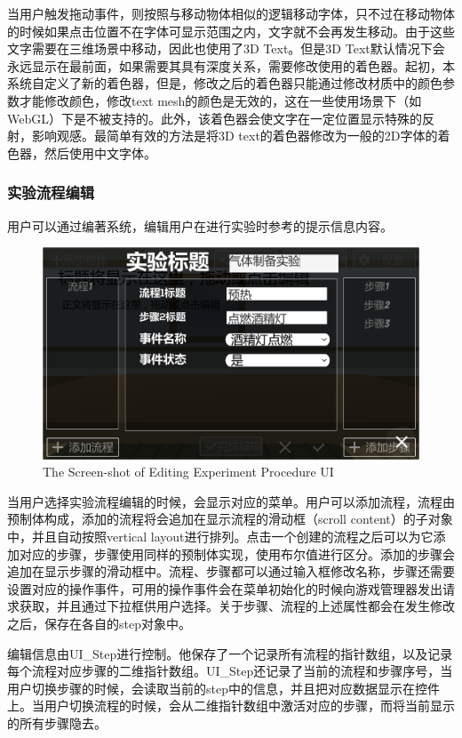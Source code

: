 当用户触发拖动事件，则按照与移动物体相似的逻辑移动字体，只不过在移动物体的时候如果点击位置不在字体可显示范围之内，文字就不会再发生移动。由于这些文字需要在三维场景中移动，因此也使用了3D Text。但是3D Text默认情况下会永远显示在最前面，如果需要其具有深度关系，需要修改使用的着色器。起初，本系统自定义了新的着色器，但是，修改之后的着色器只能通过修改材质中的颜色参数才能修改颜色，修改text mesh的颜色是无效的，这在一些使用场景下（如WebGL）下是不被支持的。此外，该着色器会使文字在一定位置显示特殊的反射，影响观感。最简单有效的方法是将3D text的着色器修改为一般的2D字体的着色器，然后使用中文字体。

\subsubsection{实验流程编辑}
用户可以通过编著系统，编辑用户在进行实验时参考的提示信息内容。

\begin{figure}[!htp]
  \centering
  \includegraphics[width=12cm]{figure/step.png}
    {The Screen-shot of Editing Experiment Procedure UI}
 \label{fig:gm}
\end{figure}

当用户选择实验流程编辑的时候，会显示对应的菜单。用户可以添加流程，流程由预制体构成，添加的流程将会追加在显示流程的滑动框（scroll content）的子对象中，并且自动按照vertical layout进行排列。点击一个创建的流程之后可以为它添加对应的步骤，步骤使用同样的预制体实现，使用布尔值进行区分。添加的步骤会追加在显示步骤的滑动框中。流程、步骤都可以通过输入框修改名称，步骤还需要设置对应的操作事件，可用的操作事件会在菜单初始化的时候向游戏管理器发出请求获取，并且通过下拉框供用户选择。关于步骤、流程的上述属性都会在发生修改之后，保存在各自的step对象中。

编辑信息由UI\_Step进行控制。他保存了一个记录所有流程的指针数组，以及记录每个流程对应步骤的二维指针数组。UI\_Step还记录了当前的流程和步骤序号，当用户切换步骤的时候，会读取当前的step中的信息，并且把对应数据显示在控件上。当用户切换流程的时候，会从二维指针数组中激活对应的步骤，而将当前显示的所有步骤隐去。



